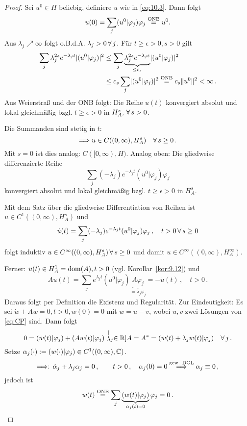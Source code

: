 \begin{proof}
Sei $u^0 \in H$ beliebig, definiere $u$ wie in \eqref{eq:10.3}. Dann folgt
\[
	u(0) = \sum_j (u^0|\varphi_j)\varphi_j \stackrel{\scriptsize\text{ONB}}= u^0.
\]
Aus $\lambda_j \nearrow \infty$ folgt o.B.d.A. $\lambda_j > 0 \, \forall \, j$. Für $t \geq \epsilon > 0, s  > 0$ gilt
\begin{align*}
	\sum_j \lambda_j^{2s} e^{-\lambda_j t}\lvert (u^0|\varphi_j)\rvert^2 & \leq \sum_j \underbrace{\lambda_j^{2s} e^{-\lambda_j \varepsilon}}_{\leq c_s} \lvert (u^0|\varphi_j)\rvert^2 \\
	& \leq  c_s \sum_j\lvert (u^0|\varphi_j)\rvert^2 \stackrel{\scriptsize\text{ONB}}= c_s \lVert u^0\rVert^2 < \infty \, .
\end{align*}
Aus Weierstraß und der ONB folgt: Die Reihe $u(t)$ konvergiert absolut und lokal gleichmäßig bzgl. $t \geq \epsilon > 0$ in $H^s_A ,\, \forall \, s >0$.

Die Summanden sind stetig in $t$:
\[
	\Longrightarrow u \in C((0,\infty),H_A^s) \quad \forall \, s \geq 0 \, .
\]
Mit $s = 0$ ist dies analog: $C([0,\infty),H)$. Analog oben: Die gliedweise differenzierte Reihe
\[
	\sum_j (-\lambda_j) e^{-\lambda_jt} (u^0|\varphi_j)\varphi_j
\]
konvergiert absolut und lokal gleichmäßig bzgl. $t\geq \epsilon > 0$ in $H^s_A$. 

Mit dem Satz über die gliedweise Differentiation von Reihen ist $u \in C^1((0,\infty),H^s_A)$ und
\[
	\dot u (t) = \sum_j (-\lambda_j) e^{-\lambda_jt} (u^0|\varphi_j)\varphi_j\, , \quad t>0 \, \forall \, s \geq 0
\]
folgt induktiv $u \in C^\infty ((0,\infty),H^s_A) \, \forall \, s \geq 0$ und damit  $u \in C^\infty ((0,\infty),H^\infty_A)$.

Ferner: $u (t) \in H^1_A = \operatorname{dom} (A) , t > 0$ (vgl. Korollar~\ref{kor:9.12}) und
\[
	Au(t) = \sum_j e^{\lambda_j t}(u^0|\varphi_j)\underbrace{A\varphi_j}_{=\lambda_j \varphi_j} =-\dot u(t) \, , \quad t >0 \, .
\]
Daraus folgt per Definition die Existenz und Regularität. Zur Eindeutigkeit: Es sei $\dot w + Aw = 0, t >0, w(0) = 0$ mit $w = u-v$, wobei $u, v$ zwei Lösungen von \eqref{eq:CP} sind. Dann folgt
\[
	0 = (\dot w(t)|\varphi_j) + (Aw(t)|\varphi_j) \stackrel[\lambda_j \in \mathbb{R}]{A = A^\ast}= (\dot w(t)+ \lambda_j w(t)|\varphi_j) \quad \forall \, j \, .
\]
Setze $\alpha_j (\cdot) := (w(\cdot)|\varphi_j) \in C^1((0,\infty),\mathbb{C})$.
\[
	\Longrightarrow : \, \dot \alpha_j + \lambda_j \alpha_j = 0 \, , \qquad t > 0 \, , \quad\alpha_j(0) = 0 \stackrel{\scriptsize\text{gew. DGL}}{\Longrightarrow} \alpha_j \equiv 0 \, ,
\]
jedoch ist
\[
	w(t) \stackrel{\scriptsize\text{ONB}}= \sum_j \underbrace{(w(t)|\varphi_j)}_{\alpha_j(t)=0} \varphi_j = 0\, .
\]
\end{proof}

